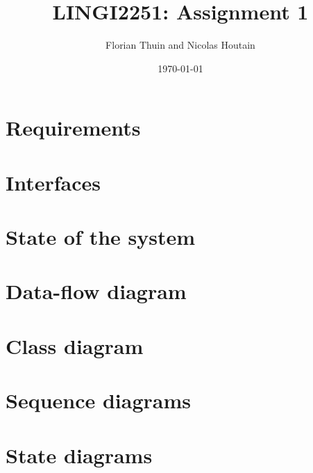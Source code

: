 \documentclass[11pt, a4paper]{article}
\title{LINGI2251: Assignment 1}
\author{Florian Thuin and Nicolas Houtain}
\date{\today}
\begin{document}
\maketitle
\tableofcontents

\section{Requirements}


\section{Interfaces}


\section{State of the system}



\section{Data-flow diagram}



\section{Class diagram}



\section{Sequence diagrams}



\section{State diagrams}

\end{document}
